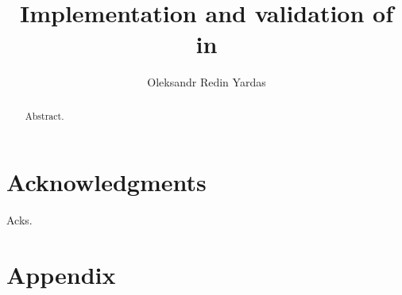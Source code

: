 \documentclass[edeposit,fullpage]{uiucthesis2018}
\title{Implementation and validation of \OpenMC in \SaltProc}
\author{Oleksandr Redin Yardas}
\begin{document}

\maketitle

\frontmatter
\begin{abstract}

Abstract.

\end{abstract}

\chapter*{Acknowledgments}

Acks.


\tableofcontents
\listoftables
\listoffigures


\pagebreak
\mainmatter




%
%

\chapter*{Appendix}


\backmatter



\end{document}
